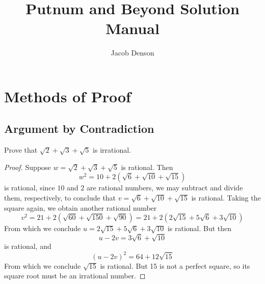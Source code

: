 

\title{Putnum and Beyond Solution Manual}
\author{Jacob Denson}



\maketitle
\tableofcontents
{}

\chapter{Methods of Proof}

\section{Argument by Contradiction}

\begin{exercise} Prove that $\sqrt{2} + \sqrt{3} + \sqrt{5}$ is irrational. \end{exercise}
\begin{proof}
    Suppose $w = \sqrt{2} + \sqrt{3} + \sqrt{5}$ is rational. Then
    \[ w^2 = 10 + 2(\sqrt{6} + \sqrt{10} + \sqrt{15}) \]
    is rational, since $10$ and $2$ are rational numbers, we may subtract and divide them, respectively, to conclude that $v = \sqrt{6} + \sqrt{10} + \sqrt{15}$ is rational. Taking the square again, we obtain another rational number
    \[ v^2 = 21 + 2(\sqrt{60} + \sqrt{150} + \sqrt{90}) = 21 + 2(2\sqrt{15} + 5 \sqrt{6} + 3 \sqrt{10}) \]
    From which we conclude $u = 2\sqrt{15} + 5 \sqrt{6} + 3\sqrt{10}$ is rational. But then
    \[ u - 2v = 3 \sqrt{6} + \sqrt{10} \]
    is rational, and
    \[ (u - 2v)^2 = 64 + 12 \sqrt{15} \]
    From which we conclude $\sqrt{15}$ is rational. But 15 is not a perfect square, so its square root must be an irrational number.
\end{proof}

